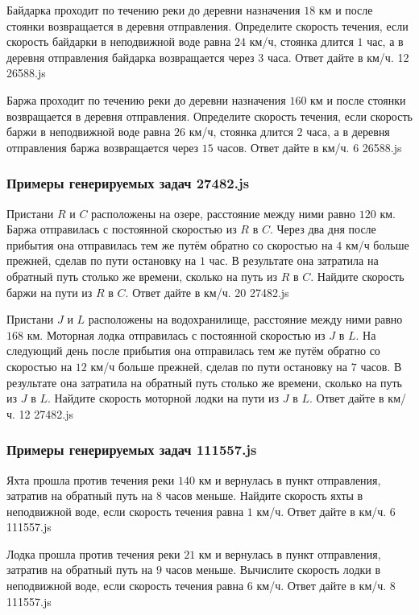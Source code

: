 \par{Байдарка проходит по течению реки до деревни назначения $18$ км и после стоянки возвращается в деревня отправления. Определите скорость течения, если скорость байдарки в неподвижной воде равна $24$ км/ч, стоянка длится $1$ час, а в деревня отправления байдарка возвращается через $3$ часа. Ответ дайте в км/ч. }{ 12 }{26588.js}
\par{Баржа проходит по течению реки до деревни назначения $160$ км и после стоянки возвращается в деревня отправления. Определите скорость течения, если скорость баржи в неподвижной воде равна $26$ км/ч, стоянка длится $2$ часа, а в деревня отправления баржа возвращается через $15$ часов. Ответ дайте в км/ч. }{ 6 }{26588.js}


\subsubsection*{Примеры генерируемых задач 27482.js}   

\par{Пристани $R$ и $C$ расположены на озере, расстояние между ними равно $120$ км. Баржа отправилась с постоянной скоростью из $R$ в $C$. Через два дня после прибытия она отправилась тем же путём обратно со скоростью на $4$ км/ч больше прежней, сделав по пути остановку на $1$ час. В результате она затратила на обратный путь столько же времени, сколько на путь из $R$ в $C$. Найдите скорость баржи на пути из $R$ в $C$. Ответ дайте в км/ч. }{ 20 }{27482.js}
\par{Пристани $J$ и $L$ расположены на водохранилище, расстояние между ними равно $168$ км. Моторная лодка отправилась с постоянной скоростью из $J$ в $L$. На следующий день после прибытия она отправилась тем же путём обратно со скоростью на $12$ км/ч больше прежней, сделав по пути остановку на $7$ часов. В результате она затратила на обратный путь столько же времени, сколько на путь из $J$ в $L$. Найдите скорость моторной лодки на пути из $J$ в $L$. Ответ дайте в км/ч. }{ 12 }{27482.js}


\subsubsection*{Примеры генерируемых задач 111557.js}

\par{Яхта прошла против течения реки $140$ км и вернулась в пункт отправления, затратив на обратный путь на $8$ часов меньше. Найдите скорость яхты в неподвижной воде, если скорость течения равна $1$ км/ч. Ответ дайте в км/ч. }{ 6 }{111557.js}
\par{Лодка прошла против течения реки $21$ км и вернулась в пункт отправления, затратив на обратный путь на $9$ часов меньше. Вычислите скорость лодки в неподвижной воде, если скорость течения равна $6$ км/ч. Ответ дайте в км/ч. }{ 8 }{111557.js}

